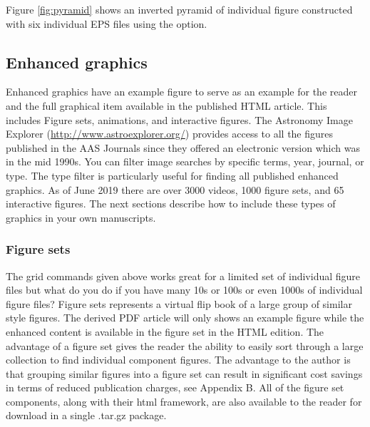 \documentclass{aastex63}
\begin{document}
Figure \ref{fig:pyramid} shows an inverted pyramid of individual
figure constructed with six individual EPS files using the
{\tt\string\gridline} option.

\begin{figure*}
\caption{Inverted pyramid figure of six individual files. The nova are
(a) V2491 Cyg, (b) HV Cet, (c) LMC 2009, (d) RS Oph, (e) U Sco, and (f) 
KT Eri. These individual figures are taken from \citet{2011ApJS..197...31S}.
\label{fig:pyramid}}
\end{figure*}

\subsection{Enhanced graphics}

Enhanced graphics have an example figure to serve as an example for the
reader and the full graphical item available in the published HTML article.
This includes Figure sets, animations, and interactive figures. The 
Astronomy Image Explorer (\url{http://www.astroexplorer.org/}) provides 
access to all the figures published in the AAS Journals since they offered
an electronic version which was in the mid 1990s. You can filter image
searches by specific terms, year, journal, or type. The type filter is 
particularly useful for finding all published enhanced graphics. As of
June 2019 there are over 3000 videos, 1000 figure sets, and 65 interactive
figures. The next sections describe how to include these types of graphics
in your own manuscripts.

\subsubsection{Figure sets}

The grid commands given above works great for a limited set of individual
figure files but what do you do if you have many 10s or 100s or even 1000s of
individual figure files? Figure sets represents a virtual flip book of a
large group of similar style figures.  The derived PDF article will only
shows an example figure while the enhanced content is available in the
figure set in the HTML edition.  The advantage of a figure set gives the
reader the ability to easily sort through a large collection to find
individual component figures.  The advantage to the author is that grouping
similar figures into a figure set can result in significant cost savings in
terms of reduced publication charges, see Appendix B. All of the figure set
components, along with their html framework, are also available to the reader
for download in a single .tar.gz package.
\end{document}
